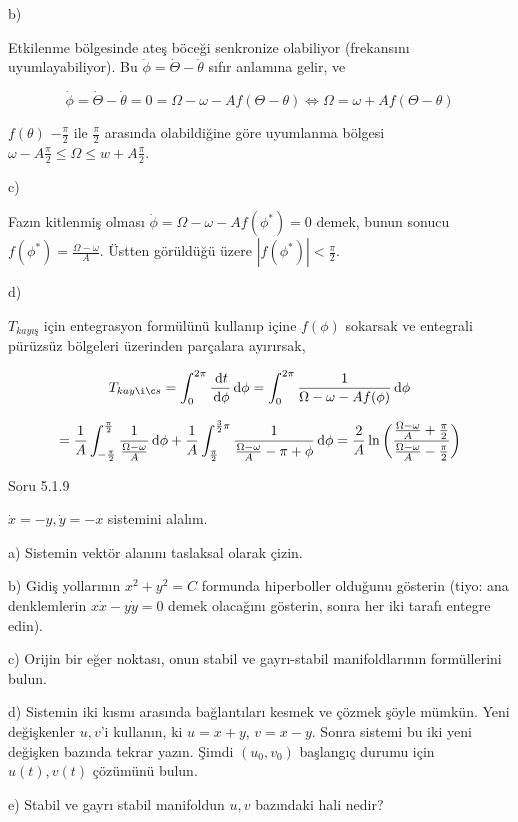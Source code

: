 \documentclass[12pt,fleqn]{article}\usepackage{../../common}
\begin{document}
b)

Etkilenme bölgesinde ateş böceği senkronize olabiliyor (frekansını
uyumlayabiliyor). Bu $\dot{\phi} = \dot{\Theta} - \dot{\theta}$ sıfır anlamına
gelir, ve

$$  \dot{\phi} = \dot{\Theta} - \dot{\theta} = 0 =
\Omega - \omega - A f(\Theta-\theta) \iff
\Omega = \omega + A f(\Theta-\theta)
$$

$f(\theta)$ $-\frac{\pi}{2}$ ile $\frac{\pi}{2}$ arasında olabildiğine göre
uyumlanma bölgesi $\omega - A \frac{\pi}{2} \le \Omega \le w + A
\frac{\pi}{2}$.

c)

Fazın kitlenmiş olması $\dot{\phi} = \Omega - \omega - A f(\phi^\ast) = 0$ demek,
bunun sonucu $f(\phi^\ast) = \frac{\Omega - \omega}{A}$. Üstten görüldüğü üzere
$|f(\phi^\ast)| < \frac{\pi}{2}$. 

d)

$T_{kayış}$ için entegrasyon formülünü kullanıp içine $f(\phi)$ sokarsak ve
entegrali pürüzsüz bölgeleri üzerinden parçalara ayırırsak,

$$ T_{kayış} =
\int_{0}^{2\pi} \frac{\ud t}{\ud \phi} \ud \phi =
\int_{0}^{2\pi} \frac{1}{\Omega - \omega - Af(\phi)} \ud \phi
$$

$$ = \frac{1}{A} \int_{-\frac{\pi}{2}}^{\frac{\pi}{2}}
\frac{1}{\frac{\Omega-\omega}{A}} \,\mathrm{d} \phi +
\frac{1}{A} \int_{\frac{\pi}{2}}^{\frac{3}{2}\pi} \frac{1}{\frac{\Omega-\omega}{A}-\pi+\phi}\,\mathrm{d}\phi
= \frac{2}{A} \ln \bigg(
\frac
    {\frac{\Omega-\omega}{A} + \frac{\pi}{2}}
    {\frac{\Omega-\omega}{A} - \frac{\pi}{2}}
\bigg)
$$

Soru 5.1.9

$\dot{x} = -y, \dot{y} = -x$ sistemini alalım.

a) Sistemin vektör alanını taslaksal olarak çizin.

b) Gidiş yollarının $x^2+y^2=C$ formunda hiperboller olduğunu gösterin (tiyo:
ana denklemlerin $x\dot{x}-y\dot{y}=0$ demek olacağını gösterin, sonra her iki
tarafı entegre edin).

c) Orijin bir eğer noktası, onun stabil ve gayrı-stabil manifoldlarının
formüllerini bulun.

d) Sistemin iki kısmı arasında bağlantıları kesmek ve çözmek şöyle mümkün. Yeni
değişkenler $u,v$'i kullanın, ki $u=x+y$, $v=x-y$. Sonra sistemi bu iki yeni
değişken bazında tekrar yazın. Şimdi $(u_0,v_0)$ başlangıç durumu için
$u(t),v(t)$ çözümünü bulun.

e) Stabil ve gayrı stabil manifoldun $u,v$ bazındaki hali nedir?
\end{document}
